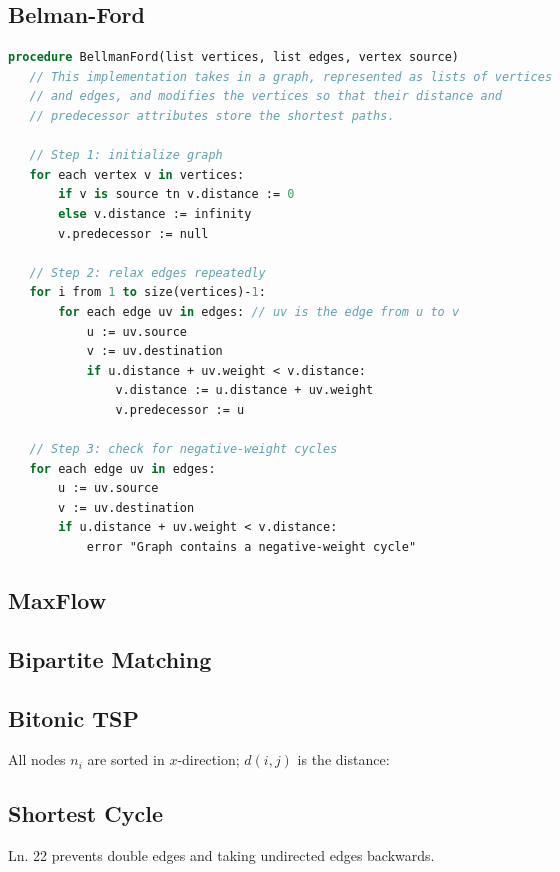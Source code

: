 \documentclass[10pt,a4paper,ngerman,oneside,]{article}
\begin{document}
\begin{multicols}{2}
\subsection{Belman-Ford}
\begin{lstlisting}[language=pascal]
procedure BellmanFord(list vertices, list edges, vertex source)
   // This implementation takes in a graph, represented as lists of vertices
   // and edges, and modifies the vertices so that their distance and
   // predecessor attributes store the shortest paths.

   // Step 1: initialize graph
   for each vertex v in vertices:
       if v is source tn v.distance := 0
       else v.distance := infinity
       v.predecessor := null

   // Step 2: relax edges repeatedly
   for i from 1 to size(vertices)-1:
       for each edge uv in edges: // uv is the edge from u to v
           u := uv.source
           v := uv.destination
           if u.distance + uv.weight < v.distance:
               v.distance := u.distance + uv.weight
               v.predecessor := u

   // Step 3: check for negative-weight cycles
   for each edge uv in edges:
       u := uv.source
       v := uv.destination
       if u.distance + uv.weight < v.distance:
           error "Graph contains a negative-weight cycle"
\end{lstlisting}
\subsection{MaxFlow}

\subsection{Bipartite Matching}

\hash{--------------------------------}
\subsection{Bitonic TSP}
All nodes $n_i$ are sorted in $x$-direction; $d(i,j)$ is the distance:

\subsection{Shortest Cycle}
Ln. 22 prevents double edges and taking undirected edges backwards. 


\end{multicols}
\end{document}
